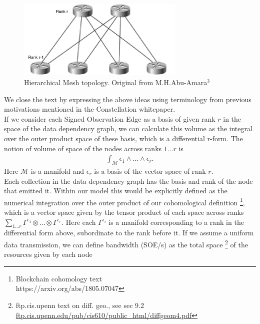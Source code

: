 \documentclass{article}
\begin{document}
\begin{figure}[h]
\centering
\includegraphics[width=8cm]{Designing_a_network_topology-M_H_Abu-Amara}
\caption{Hierarchical Mesh topology. Original from M.H.Abu-Amara$^3$} %
\end{figure}

We close the text by expressing the above ideas using terminology from previous motivations mentioned in the Constellation whitepaper.\\
If we consider each Signed Observation Edge as a basis of given rank $r$ in the space of the data dependency graph, we can calculate this volume as the integral over the outer product space of these basis, which is a differential r-form.
The notion of volume of space of the nodes across ranks $1 \dots r$ is
\begin{equation*} \label{eq1}
\begin{split}
\int_\mathcal{M} \epsilon_1 \wedge \dots \wedge \epsilon_r.
\end{split}
\end{equation*}
Here $\mathcal{M}$ is a manifold and $\epsilon_r$ is a basis of the vector space of rank $r$. \\
Each collection in the data dependency graph has the basis and rank of the node that emitted it. Within our model this would be explicitly defined as the numerical integration over the outer product of our cohomological definition
\footnote{Blockchain cohomology text\\ https://arxiv.org/abs/1805.07047},
which is a vector space given by the tensor product of each space across ranks 
{$\sum_{1 \dots r} \Gamma^{\epsilon_1} \otimes \dots \otimes \Gamma^{\epsilon_r}$}.
Here each $\Gamma^{\epsilon_i}$ is a manifold corresponding to a rank in the differential form above, subordinate to the rank before it. If we assume a uniform data transmission, we can define bandwidth (SOE/s) as the total space
\footnote{ftp.cis.upenn text on diff. geo., see sec 9.2\\ \url{ftp.cis.upenn.edu/pub/cis610/public_html/diffgeom4.pdf}} 
of the resources given by each node
\end{document}
